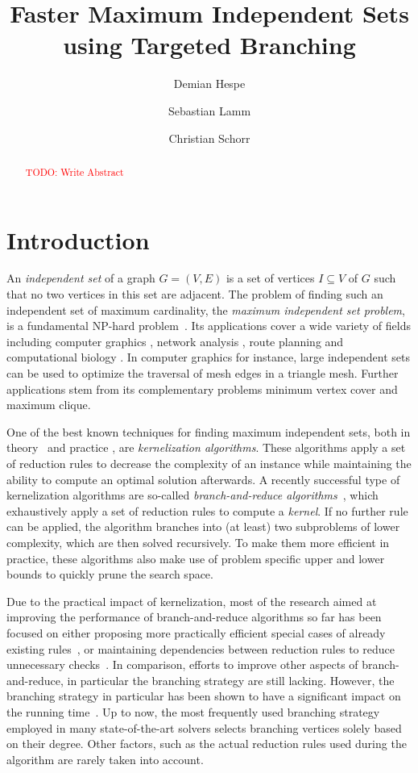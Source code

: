 \documentclass[a4paper,UKenglish,cleveref, autoref, thm-restate]{lipics-v2021}
\title{Faster Maximum Independent Sets using Targeted Branching} %
\author{Demian Hespe}{Karlsruhe Institute of Technology, Institute for
  Theoretical Informatics, Germany}{hespe@kit.edu}{}{}
\author{Sebastian Lamm}{Karlsruhe Institute of Technology, Institute for
  Theoretical Informatics, Germany}{lamm@kit.edu}{}{\textcolor{red} {TODO: Add funding}}
\author{Christian Schorr}{Karlsruhe Institute of Technology, Institute for
  Theoretical Informatics, Germany}{uztfp@student.kit.edu}{}{}
\begin{document}
\maketitle

\begin{abstract}
  \textcolor{red}{TODO: Write Abstract}
\end{abstract}

\newpage

\section{Introduction}
An \emph{independent set} of a graph $G = (V,E)$ is a set of vertices $I \subseteq V$ of $G$ such that no two vertices in this set are adjacent. The problem of finding such an independent set of maximum cardinality, the \emph{maximum independent set problem}, is a fundamental NP-hard problem~\cite{Garey1974}. Its applications cover a wide variety of fields including computer graphics \cite{CG}, network analysis \cite{NW}, route planning \cite{RP} and computational biology \cite{BIO1, BIO2}. In computer graphics for instance, large independent sets can be used to optimize the traversal of mesh edges in a triangle mesh. Further applications stem from its complementary problems minimum vertex cover and maximum clique.

One of the best known techniques for finding maximum independent sets, both in theory~\cite{XiaoNagamochi, ChenXiaKanj} and practice \cite{AkibaIwata}, are \emph{kernelization algorithms}. These algorithms apply a set of reduction rules to decrease the complexity of an instance while maintaining the ability to compute an optimal solution afterwards. A recently successful type of kernelization algorithms are so-called \emph{branch-and-reduce algorithms}~\cite{AkibaIwata,WGYC}, which exhaustively apply a set of reduction rules to compute a \emph{kernel}. If no further rule can be applied, the algorithm branches into (at least) two subproblems of lower complexity, which are then solved recursively. To make them more efficient in practice, these algorithms also make use of problem specific upper and lower bounds to quickly prune the search space.

Due to the practical impact of kernelization, most of the research aimed at improving the performance of branch-and-reduce algorithms so far has been focused on either proposing more practically efficient special cases of already existing rules~\cite{ChangKern,dahlum2016accelerating}, or maintaining dependencies between reduction rules to reduce unnecessary checks~\cite{alsahafy2020computing,hespe2019scalable}. In comparison, efforts to improve other aspects of branch-and-reduce, in particular the branching strategy are still lacking. However, the branching strategy in particular has been shown to have a significant impact on the running time~\cite{AkibaIwata}. Up to now, the most frequently used branching strategy employed in many state-of-the-art solvers selects branching vertices solely based on their degree. Other factors, such as the actual reduction rules used during the algorithm are rarely taken into account.
\end{document}
